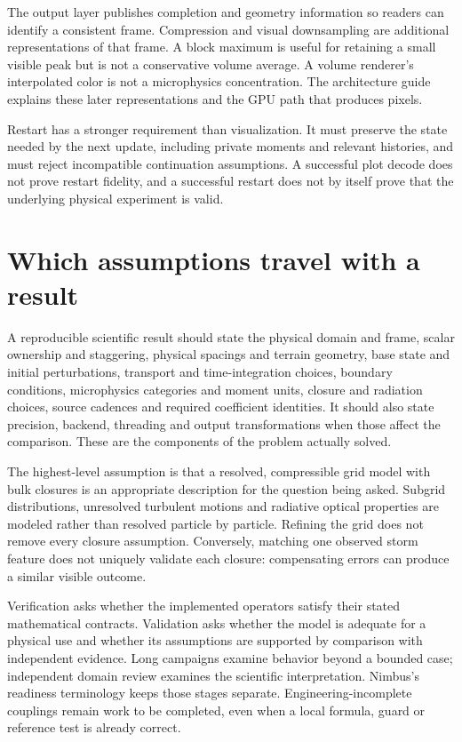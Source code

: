 The output layer publishes completion and geometry information so readers can
identify a consistent frame. Compression and visual downsampling are additional
representations of that frame. A block maximum is useful for retaining a small
visible peak but is not a conservative volume average. A volume renderer's
interpolated color is not a microphysics concentration. The architecture guide
explains these later representations and the GPU path that produces pixels.

Restart has a stronger requirement than visualization. It must preserve the
state needed by the next update, including private moments and relevant
histories, and must reject incompatible continuation assumptions. A successful
plot decode does not prove restart fidelity, and a successful restart does not
by itself prove that the underlying physical experiment is valid.

\section{Which assumptions travel with a result}

A reproducible scientific result should state the physical domain and frame,
scalar ownership and staggering, physical spacings and terrain geometry, base
state and initial perturbations, transport and time-integration choices,
boundary conditions, microphysics categories and moment units, closure and
radiation choices, source cadences and required coefficient identities. It
should also state precision, backend, threading and output transformations
when those affect the comparison. These are the components of the problem
actually solved.

The highest-level assumption is that a resolved, compressible grid model with
bulk closures is an appropriate description for the question being asked.
Subgrid distributions, unresolved turbulent motions and radiative optical
properties are modeled rather than resolved particle by particle. Refining the
grid does not remove every closure assumption. Conversely, matching one
observed storm feature does not uniquely validate each closure: compensating
errors can produce a similar visible outcome.

Verification asks whether the implemented operators satisfy their stated
mathematical contracts. Validation asks whether the model is adequate for a
physical use and whether its assumptions are supported by comparison with
independent evidence. Long campaigns examine behavior beyond a bounded case;
independent domain review examines the scientific interpretation. Nimbus's
readiness terminology keeps those stages separate. Engineering-incomplete
couplings remain work to be completed, even when a local formula, guard or
reference test is already correct.
